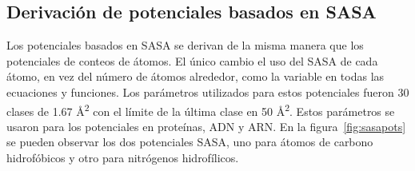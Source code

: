 \subsection{Derivación de potenciales basados en SASA}
\par
Los potenciales basados en SASA se derivan de la misma manera que los potenciales de conteos de átomos.
El único cambio el uso del SASA de cada átomo, en vez del número de átomos alrededor, como la variable en todas las ecuaciones y funciones.
Los parámetros utilizados para estos potenciales fueron 30 clases de 1.67 \si{\angstrom}\textsuperscript{2} con el límite de la última clase en 50 \si{\angstrom}\textsuperscript{2}.
Estos parámetros se usaron para los potenciales en proteínas, ADN y ARN.
En la figura~\ref{fig:sasapots} se pueden observar los dos potenciales SASA, uno para átomos de carbono hidrofóbicos y otro para nitrógenos hidrofílicos.

